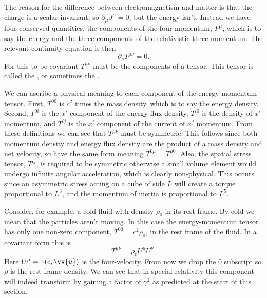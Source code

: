 \documentclass[fleqn]{NotesClass}
\begin{document}
    The reason for the difference between electromagnetism and matter is that the charge is a scalar invariant, so \(\partial_\mu J^\mu = 0\), but the energy isn't.
    Instead we have four conserved quantities, the components of the four-momentum, \(P^\mu\), which is to say the energy and the three components of the relativistic three-momentum.
    The relevant continuity equation is then
    \begin{equation}
        \partial_\nu T^{\mu\nu} = 0.
    \end{equation}
    For this to be covariant \(T^{\mu\nu}\) must be the components of a tensor.
    This tensor is called the , or sometimes the .
    
    We can ascribe a physical meaning to each component of the energy-momentum tensor.
    First, \(T^{00}\) is \(c^2\) times the mass density, which is to say the energy density.
    Second, \(T^{0i}\) is the \(x^i\) component of the energy flux density, \(T^{i0}\) is the density of \(x^i\) momentum, and \(T^{ij}\) is the \(x^i\) component of the current of \(x^j\) momentum.
    From these definitions we can see that \(T^{\mu\nu}\) must be symmetric.
    This follows since both momentum density and energy flux density are the product of a mass density and net velocity, so have the same form meaning \(T^{0\mu} = T^{\mu0}\).
    Also, the spatial stress tensor, \(T^{ij}\), is required to be symmetric otherwise a small volume element would undergo infinite angular acceleration, which is clearly non-physical.
    This occurs since an asymmetric stress acting on a cube of side \(L\) will create a torque proportional to \(L^3\), and the momentum of inertia is proportional to \(L^5\).
    
    Consider, for example, a cold fluid with density \(\rho_0\) in its rest frame.
    By cold we mean that the particles aren't moving.
    In this case the energy-momentum tensor has only one non-zero component, \(T^{00} = c^2\rho_0\), in the rest frame of the fluid.
    In a covariant form this is
    \begin{equation}
        T^{\mu\nu} = \rho_0 U^\mu U^\nu.
    \end{equation}
    Here \(U^\mu = \gamma(c, \vv{u})\) is the four-velocity.
    From now we drop the \(0\) subscript so \(\rho\) is the rest-frame density.
    We can see that in special relativity this component will indeed transform by gaining a factor of \(\gamma^2\) as predicted at the start of this section.
    
\end{document}
